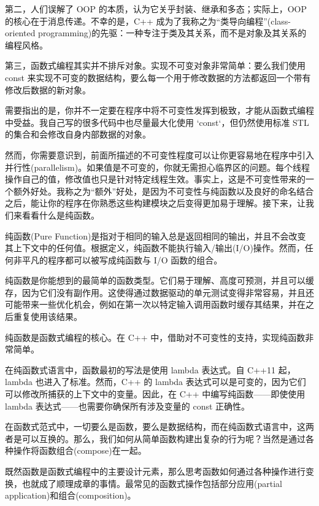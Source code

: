 第二，人们误解了 OOP 的本质，认为它关乎封装、继承和多态；实际上，OOP 的核心在于消息传递。不幸的是，C++ 成为了我称之为“类导向编程”(class-oriented programming)的先驱：一种专注于类及其关系，而不是对象及其关系的编程风格。

第三，函数式编程其实并不排斥对象。实现不可变对象非常简单：要么我们使用 const 来实现不可变的数据结构，要么每一个用于修改数据的方法都返回一个带有修改后数据的新对象。

需要指出的是，你并不一定要在程序中将不可变性发挥到极致，才能从函数式编程中受益。我自己写的很多代码中也尽量最大化使用 `const`，但仍然使用标准 STL 的集合和会修改自身内部数据的对象。

然而，你需要意识到，前面所描述的不可变性程度可以让你更容易地在程序中引入并行性(parallelism)。如果值是不可变的，你就无需担心临界区的问题。每个线程操作自己的值，修改值也只是针对特定线程生效。事实上，这是不可变性带来的一个额外好处。我称之为“额外”好处，是因为不可变性与纯函数以及良好的命名结合之后，能让你的程序在你熟悉这些构建模块之后变得更加易于理解。接下来，让我们来看看什么是纯函数。


纯函数(Pure Function)是指对于相同的输入总是返回相同的输出，并且不会改变其上下文中的任何值。根据定义，纯函数不能执行输入/输出(I/O)操作。然而，任何非平凡的程序都可以被写成纯函数与 I/O 函数的组合。

纯函数是你能想到的最简单的函数类型。它们易于理解、高度可预测，并且可以缓存，因为它们没有副作用。这使得通过数据驱动的单元测试变得非常容易，并且还可能带来一些优化机会，例如在第一次以特定输入调用函数时缓存其结果，并在之后重复使用该结果。

纯函数是函数式编程的核心。在 C++ 中，借助对不可变性的支持，实现纯函数非常简单。

在纯函数式语言中，函数最初的写法是使用 lambda 表达式。自 C++11 起，lambda 也进入了标准。然而，C++ 的 lambda 表达式可以是可变的，因为它们可以修改所捕获的上下文中的变量。因此，在 C++ 中编写纯函数——即使使用 lambda 表达式——也需要你确保所有涉及变量的 const 正确性。

在函数式范式中，一切要么是函数，要么是数据结构，而在纯函数式语言中，这两者是可以互换的。那么，我们如何从简单函数构建出复杂的行为呢？当然是通过各种操作将函数组合(compose)在一起。



既然函数是函数式编程中的主要设计元素，那么思考函数如何通过各种操作进行变换，也就成了顺理成章的事情。最常见的函数式操作包括部分应用(partial application)和组合(composition)。

